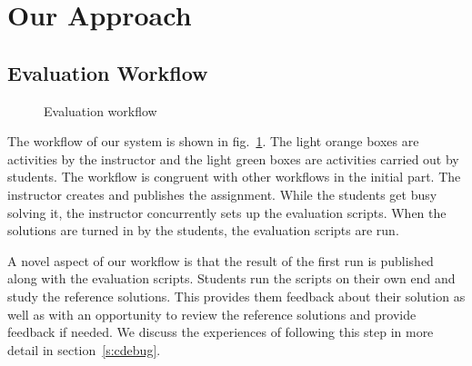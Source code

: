 \documentclass[sigconf]{acmart}
\begin{document}
\section{Our Approach}

\subsection{Evaluation Workflow} \label{s:workflow}

\begin{figure}

\caption{Evaluation workflow}
\label{f:workflow}
\end{figure}

The workflow of our system is shown in fig.~\ref{f:workflow}. The light orange boxes are activities by the instructor and the light green boxes are activities carried out by students. The workflow is congruent with other workflows in the initial part. The instructor creates and publishes the assignment. While the students get busy solving it, the instructor concurrently sets up the evaluation scripts. When the solutions are turned in by the students, the evaluation scripts are run.

A novel aspect of our workflow is that the result of the first run is published along with the evaluation scripts. Students run the scripts on their own end and study the reference solutions. This provides them feedback about their solution as well as with an opportunity to review the reference solutions and provide feedback if needed. We discuss the experiences of following this step in more detail in section~\ref{s:cdebug}.
\end{document}
